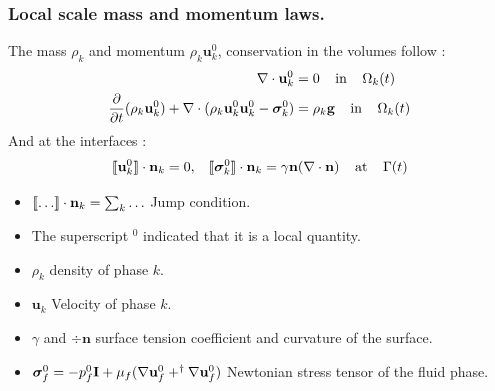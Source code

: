 \documentclass{sintefbeamer}
\begin{document}
\begin{frame}
  \frametitle{Local scale mass and momentum laws.}
  The mass $\rho_k$ and momentum $\rho_k \textbf{u}_k^0$, conservation in the volumes follow :
\begin{align}
  \mathbf{\nabla}\cdot  \textbf{u}_k^0
  &= 
  0
  \;\;\;\; 
  \text{in} 
  \;\;\;\; 
  \Omega_k(t)\\
  \frac{\partial}{\partial t} (\rho_k \textbf{u}_k^0)  
  + \mathbf{\nabla}\cdot (
      \rho_k \textbf{u}_k^0\textbf{u}_k^0
      - \bm{\sigma}_k^0 
      )
  &= 
  \rho_k \textbf{g}
  \;\;\;\; 
  \text{in} 
  \;\;\;\; 
  \Omega_k(t)
\end{align}
And at the interfaces : 
\begin{align*}
  \llbracket \textbf{u}_k^0 \rrbracket \cdot \textbf{n}_k
  = 0,\;\;\;
  \llbracket \bm{\sigma}_k^0 \rrbracket \cdot \textbf{n}_k
  = 
   \gamma\textbf{n}(\mathbf{\nabla}\cdot \textbf{n})
   \;\;\;\; 
   \text{at} 
   \;\;\;\; 
   \Gamma(t)
\end{align*}
\begin{definition}
  \begin{itemize}
    \item $\llbracket \ldots \rrbracket \cdot \textbf{n}_k = \sum_k \ldots$ Jump condition.  
    \item The superscript $^0$ indicated that it is a local quantity.
    \item $\rho_k$  density of phase $k$. 
    \item $\textbf{u}_k$  Velocity of phase $k$.
    \item $\gamma$ and $\div \textbf{n}$  surface tension coefficient and curvature of the surface.  
    \item $\bm\sigma_f^0 = -p_f^0 \textbf{I} + \mu_f (\mathbf{\nabla} \textbf{u}_f^0+^\dagger\mathbf{\nabla} \textbf{u}_f^0)$ Newtonian stress tensor of the fluid phase. 
  \end{itemize}
\end{definition}

\end{frame}


  
\end{document}
